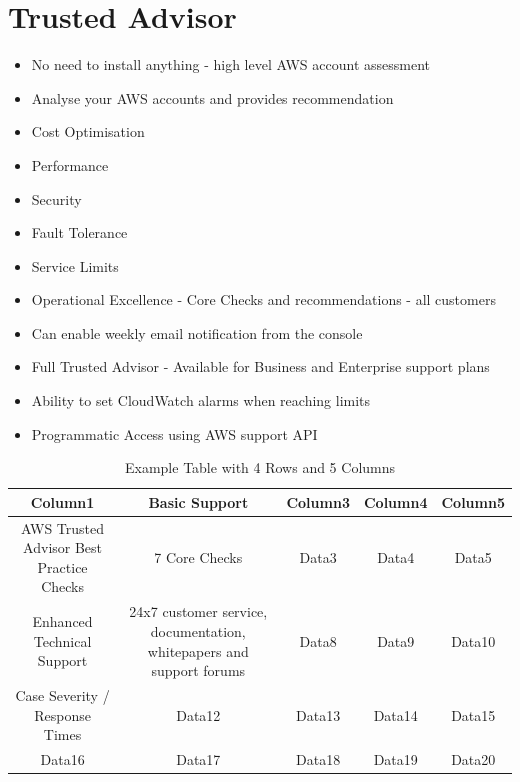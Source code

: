 \section{Trusted Advisor}
\begin{itemize}
    \item No need to install anything - high level AWS account assessment
    \item Analyse your AWS accounts and provides recommendation
    \item Cost Optimisation
    \item Performance
    \item Security
    \item Fault Tolerance
    \item Service Limits
    \item Operational Excellence
    - Core Checks and recommendations - all customers
    \item Can enable weekly email notification from the console
    \item Full Trusted Advisor - Available for Business and Enterprise support plans
    \item Ability to set CloudWatch alarms when reaching limits
    \item Programmatic Access using AWS support API
\end{itemize}

\begin{table}[h!]
    \centering
    \begin{tabular}{|c|c|c|c|c|}
        \hline
        Column1                                  & Basic Support                                                        & Column3 & Column4 & Column5 \\ \hline
        AWS Trusted Advisor Best Practice Checks & 7 Core Checks                                                        & Data3   & Data4   & Data5   \\ \hline
        Enhanced Technical Support               & 24x7 customer service, documentation, whitepapers and support forums  & Data8   & Data9   & Data10  \\ \hline
        Case Severity / Response Times           & Data12                                                               & Data13  & Data14  & Data15  \\ \hline
        Data16                                   & Data17                                                               & Data18  & Data19  & Data20  \\ \hline
    \end{tabular}
    \caption{Example Table with 4 Rows and 5 Columns}
    \label{tab:example_table}
\end{table}

